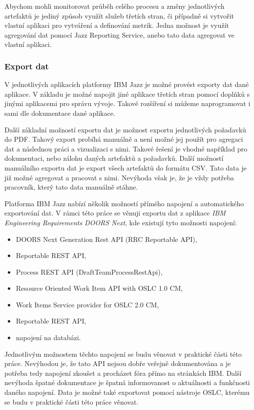 \documentclass[czech,master,public,dept460,male,cpdeclaration,oneside]{diploma}
\begin{document}
Abychom mohli monitorovat průběh celého procesu a změny jednotlivých artefaktů je jediný způsob využít služeb třetích stran, či případně si vytvořit vlastní aplikaci pro vytváření a definování metrik. Jedna možnost je využít agregování dat pomocí Jazz Reporting Service, anebo tato data agregovat ve vlastní aplikaci.

\subsubsection{Export dat}
V jednotlivých aplikacích platformy IBM Jazz je možné provést exporty dat dané aplikace. V základu je možné napojit jiné aplikace třetích stran pomocí doplňků s jinými aplikacemi pro správu vývoje. Takové rozšíření si můžeme naprogramovat i sami dle dokumentace dané aplikace.

Další základní možností exportu dat je možnost exportu jednotlivých požadavků do PDF. Takový export probíhá manuálně a není možné jej použít pro agregaci dat a následnou práci a vizualizaci s nimi. Takové řešení je vhodné například pro dokumentaci, nebo zálohu daných artefaktů a požadavků. Další možností manuálního exportu dat je export všech artefaktů do formátu CSV. Tato data je již možné agregovat a pracovat s nimi. Nevýhoda však je, že je vždy potřeba pracovník, který tato data manuálně stáhne.

Platforma IBM Jazz nabízí několik možností přímého napojení a automatického exportování dat. V rámci této práce se věnuji exportu dat z aplikace \textit{IBM Engineering Requirements DOORS Next}, kde existují tyto možnosti napojení:

\begin{itemize}
\item DOORS Next Generation Rest API (RRC Reportable API),
\item Reportable REST API,
\item Process REST API (DraftTeamProcessRestApi),
\item Resource Oriented Work Item API with OSLC 1.0 CM,
\item Work Items Service provider for OSLC 2.0 CM,
\item Reportable REST API,
\item napojení na databázi.
\end{itemize}

Jednotlivým možnostem těchto napojení se budu věnovat v praktické části této práce. Nevýhodou je, že tato API nejsou dobře veřejně dokumentována a je potřeba tedy napojení zkoušet a procházet fóra přímo na stránkách IBM. Další nevýhoda špatné dokumentace je špatná informovanost o aktuálnosti a funkčnosti daného napojení. Data je možné také exportovat pomocí nástroje OSLC, kterému se budu v praktické části této práce věnovat.
\end{document}
